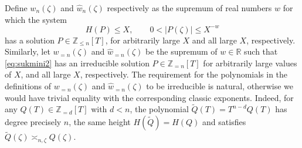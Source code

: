 \documentclass[12pt]{amsart}
\theoremstyle{definition}
\begin{document}
Define $w_{n}(\zeta)$ and $\widehat{w}_{n}(\zeta)$ respectively as the supremum of real numbers $w$ for which the system
%
\begin{equation} \label{eq:sukmini2}
H(P)\leq X, \qquad 0<\vert P(\zeta)\vert \leq X^{-w}
\end{equation}
%
has a solution $P\in\mathbb{Z}_{\leq n}[T]$, for
arbitrarily large $X$ and all large $X$, respectively.
Similarly, let $w_{=n}(\zeta)$ and $\widehat{w}_{=n}(\zeta)$ be
the supremum of $w\in{\mathbb{R}}$ such that \eqref{eq:sukmini2}
has an irreducible solution $P\in{\mathbb{Z}_{=n}[T]}$
for arbitrarily large values of $X$, and all large $X$, respectively.
The requirement for the polynomials in the definitions
of $w_{=n}(\zeta)$ and $\widehat{w}_{=n}(\zeta)$ to be irreducible is natural, otherwise
we would have trivial equality with the corresponding classic exponents. Indeed, for any
$Q(T)\in \mathbb{Z}_{=d}[T]$ with
$d<n$, the polynomial $\tilde{Q}(T)=T^{n-d}Q(T)$ has degree precisely $n$, the same
height $H(\tilde{Q})=H(Q)$ and satisfies $\tilde{Q}(\zeta)\asymp_{n,\zeta} Q(\zeta)$.
\end{document}
